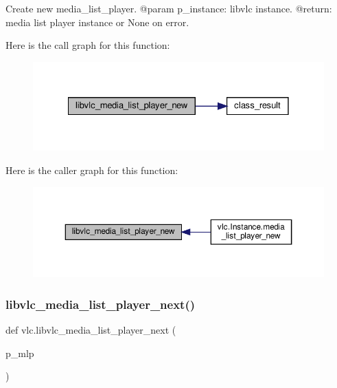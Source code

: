 \begin{DoxyVerb}Create new media_list_player.
@param p_instance: libvlc instance.
@return: media list player instance or None on error.
\end{DoxyVerb}
 Here is the call graph for this function\+:
\nopagebreak
\begin{figure}[H]
\begin{center}
\leavevmode
\includegraphics[width=328pt]{namespacevlc_ab4b8362acc8c1e94658a0dd96bc5a120_cgraph}
\end{center}
\end{figure}
Here is the caller graph for this function\+:
\nopagebreak
\begin{figure}[H]
\begin{center}
\leavevmode
\includegraphics[width=350pt]{namespacevlc_ab4b8362acc8c1e94658a0dd96bc5a120_icgraph}
\end{center}
\end{figure}
\mbox{\label{namespacevlc_ad7b227a78e34e99300dfa0d794b906cb}} 
\subsubsection{\texorpdfstring{libvlc\+\_\+media\+\_\+list\+\_\+player\+\_\+next()}{libvlc\_media\_list\_player\_next()}}
{\footnotesize\ttfamily def vlc.\+libvlc\+\_\+media\+\_\+list\+\_\+player\+\_\+next (\begin{DoxyParamCaption}\item[{}]{p\+\_\+mlp }\end{DoxyParamCaption})}

